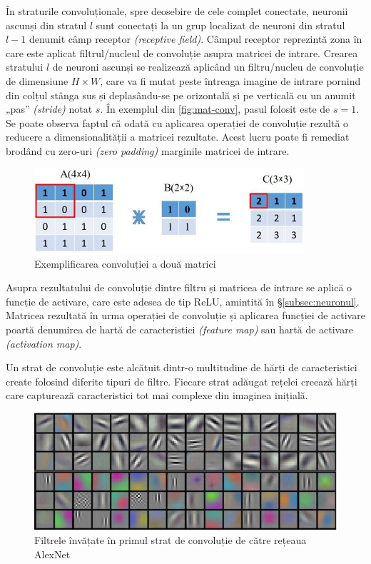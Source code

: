 În straturile convoluționale, spre deosebire de cele complet conectate, neuronii ascunși din stratul $l$ sunt conectați la un grup localizat de neuroni din stratul $l-1$ denumit câmp receptor \textit{(receptive field)}. Câmpul receptor reprezintă zona în care este aplicat filtrul/nucleul de convoluție asupra matricei de intrare. Crearea stratului $l$ de neuroni ascunși se realizează aplicând un filtru/nucleu de convoluție de dimensiune $H\times W$, care va fi mutat peste întreaga imagine de intrare pornind din colțul stânga sus și deplasându-se pe orizontală și pe verticală cu un anumit „pas” \textit{(stride)} notat $s$. În exemplul din \autoref{fig:mat-conv}, pasul folosit este de $s=1$. Se poate observa faptul că odată cu aplicarea operației de convoluție rezultă o reducere a dimensionalității a matricei rezultate. Acest lucru poate fi remediat brodând cu zero-uri \textit{(zero padding)} marginile matricei de intrare.
\begin{figure}[ht]
\centering
\includegraphics[width=10cm, keepaspectratio]{fig/cap2/conv-op.jpg}
\caption{Exemplificarea convoluției a două matrici \cite{vrejoiu:2019}}
\label{fig:mat-conv}
\end{figure}

Asupra rezultatului de convoluție dintre filtru și matricea de intrare se aplică o funcție de activare, care este adesea de tip ReLU, amintită în \S\ref{subsec:neuronul}. Matricea rezultată în urma operației de convoluție și aplicarea funcției de activare poartă denumirea de hartă de caracteristici \textit{(feature map)} sau hartă de activare \textit{(activation map)}.

Un strat de convoluție este alcătuit dintr-o multitudine de hărți de caracteristici create folosind diferite tipuri de filtre. Fiecare strat adăugat rețelei creează hărți care capturează caracteristici tot mai complexe din imaginea inițială.
\begin{figure}[ht]
\centering
\includegraphics[width=12cm, keepaspectratio]{fig/cap2/alexnet-filters.jpg}
\caption{Filtrele învățate în primul strat de convoluție de către rețeaua AlexNet \cite{alexnet:2012}}
\label{fig:alexnet-filters}
\end{figure}


